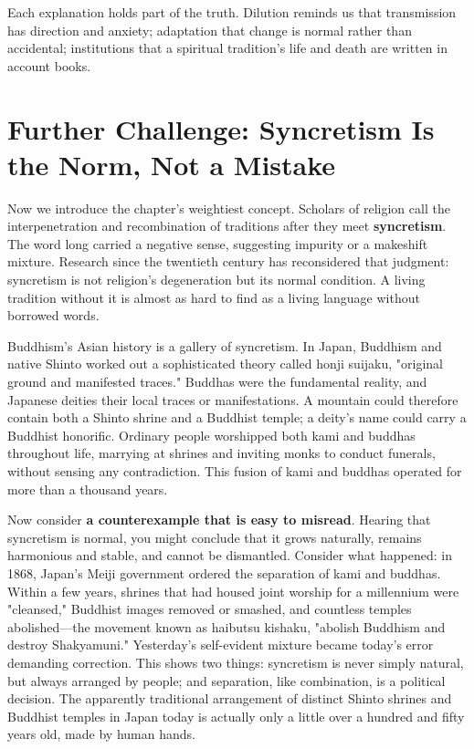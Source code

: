 Each explanation holds part of the truth. Dilution reminds us that transmission has direction and anxiety; adaptation that change is normal rather than accidental; institutions that a spiritual tradition's life and death are written in account books.

\section[Further Challenge: Syncretism]{Further Challenge: Syncretism Is the Norm, Not a Mistake}
Now we introduce the chapter's weightiest concept. Scholars of religion call the interpenetration and recombination of traditions after they meet \textbf{syncretism}. The word long carried a negative sense, suggesting impurity or a makeshift mixture. Research since the twentieth century has reconsidered that judgment: syncretism is not religion's degeneration but its normal condition. A living tradition without it is almost as hard to find as a living language without borrowed words.

Buddhism's Asian history is a gallery of syncretism. In Japan, Buddhism and native Shinto worked out a sophisticated theory called honji suijaku, "original ground and manifested traces." Buddhas were the fundamental reality, and Japanese deities their local traces or manifestations. A mountain could therefore contain both a Shinto shrine and a Buddhist temple; a deity's name could carry a Buddhist honorific. Ordinary people worshipped both kami and buddhas throughout life, marrying at shrines and inviting monks to conduct funerals, without sensing any contradiction. This fusion of kami and buddhas operated for more than a thousand years.

Now consider \textbf{a counterexample that is easy to misread}. Hearing that syncretism is normal, you might conclude that it grows naturally, remains harmonious and stable, and cannot be dismantled. Consider what happened: in 1868, Japan's Meiji government ordered the separation of kami and buddhas. Within a few years, shrines that had housed joint worship for a millennium were "cleansed," Buddhist images removed or smashed, and countless temples abolished---the movement known as haibutsu kishaku, "abolish Buddhism and destroy Shakyamuni." Yesterday's self-evident mixture became today's error demanding correction. This shows two things: syncretism is never simply natural, but always arranged by people; and separation, like combination, is a political decision. The apparently traditional arrangement of distinct Shinto shrines and Buddhist temples in Japan today is actually only a little over a hundred and fifty years old, made by human hands.

